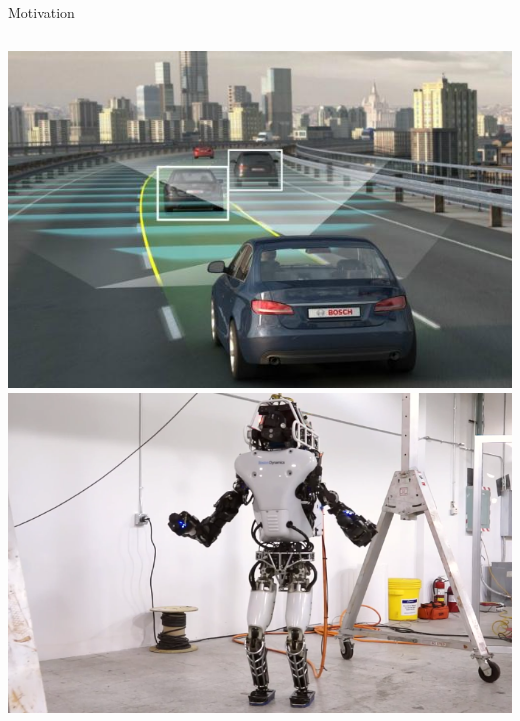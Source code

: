\documentclass{beamer}
\begin{document}
\begin{frame}{Motivation}
\begin{columns}[T]
\includegraphics[height=0.37\textheight]{img/selfdriving.jpg}\\
\vspace{1em}
\includegraphics[height=0.37\textheight]{img/atlas2.png}
\end{columns}
\end{frame}

\end{document}
